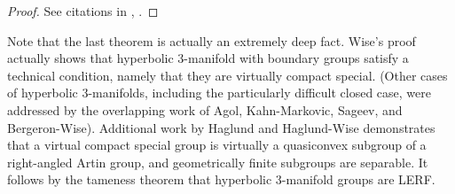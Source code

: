 \begin{proof}

See citations in \cite{LR}, \cite{AFW}.

\end{proof}

Note that the last theorem is actually an extremely deep fact. Wise's proof
actually shows that hyperbolic 3-manifold with boundary groups satisfy
a technical condition, namely that they are virtually compact special. (Other
cases of hyperbolic 3-manifolds, including the particularly difficult closed
case, were addressed by the overlapping work of Agol, Kahn-Markovic, Sageev,
and Bergeron-Wise).  Additional work by Haglund and Haglund-Wise demonstrates
that a virtual compact special group is virtually a quasiconvex subgroup of
a right-angled Artin group, and geometrically finite subgroups are separable.
It follows by the tameness theorem that hyperbolic 3-manifold groups are LERF.


